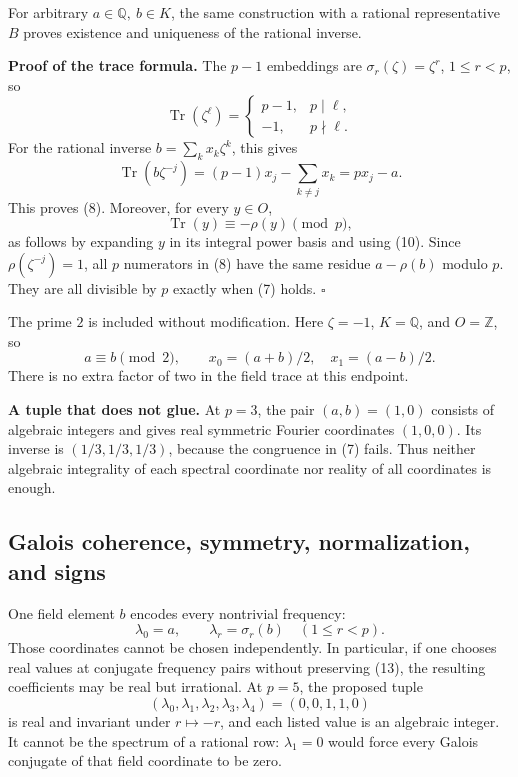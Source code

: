 \documentclass[
  11pt,
]{article}
\begin{document}
For arbitrary \(a\in\mathbb Q,\ b\in K\), the same construction with a
rational representative \(B\) proves existence and uniqueness of the
rational inverse.

\textbf{Proof of the trace formula.} The \(p-1\) embeddings are
\(\sigma_r(\zeta)=\zeta^r\), \(1\le r<p\), so \[
 \operatorname{Tr}(\zeta^\ell)=
 \begin{cases}
 p-1,&p\mid\ell,\\
 -1,&p\nmid\ell.
 \end{cases}                                             \tag{10}
\] For the rational inverse \(b=\sum_kx_k\zeta^k\), this gives \[
 \operatorname{Tr}(b\zeta^{-j})
       =(p-1)x_j-\sum_{k\ne j}x_k=px_j-a.
 \] This proves (8). Moreover, for every \(y\in O\), \[
 \operatorname{Tr}(y)\equiv-\rho(y)\pmod p,                \tag{11}
\] as follows by expanding \(y\) in its integral power basis and using
(10). Since \(\rho(\zeta^{-j})=1\), all \(p\) numerators in (8) have the
same residue \(a-\rho(b)\) modulo \(p\). They are all divisible by \(p\)
exactly when (7) holds. \(\square\)

The prime \(2\) is included without modification. Here \(\zeta=-1\),
\(K=\mathbb Q\), and \(O=\mathbb Z\), so \[
 a\equiv b\pmod2,\qquad
 x_0=(a+b)/2,\quad x_1=(a-b)/2.                            \tag{12}
\] There is no extra factor of two in the field trace at this endpoint.

\textbf{A tuple that does not glue.} At \(p=3\), the pair
\((a,b)=(1,0)\) consists of algebraic integers and gives real symmetric
Fourier coordinates \((1,0,0)\). Its inverse is \((1/3,1/3,1/3)\),
because the congruence in (7) fails. Thus neither algebraic integrality
of each spectral coordinate nor reality of all coordinates is enough.

\subsection{Galois coherence, symmetry, normalization, and
signs}\label{galois-coherence-symmetry-normalization-and-signs}

One field element \(b\) encodes every nontrivial frequency: \[
 \lambda_0=a,\qquad\lambda_r=\sigma_r(b)\quad(1\le r<p).
                                                               \tag{13}
\] Those coordinates cannot be chosen independently. In particular, if
one chooses real values at conjugate frequency pairs without preserving
(13), the resulting coefficients may be real but irrational. At \(p=5\),
the proposed tuple \[
 (\lambda_0,\lambda_1,\lambda_2,\lambda_3,\lambda_4)
       =(0,0,1,1,0)
\] is real and invariant under \(r\mapsto-r\), and each listed value is
an algebraic integer. It cannot be the spectrum of a rational row:
\(\lambda_1=0\) would force every Galois conjugate of that field
coordinate to be zero.
\end{document}
